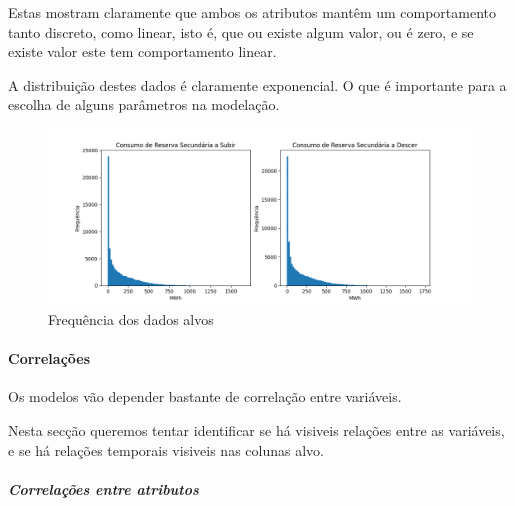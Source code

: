 Estas mostram claramente que ambos os atributos mantêm um comportamento tanto discreto, como linear, isto é, que ou existe algum valor, ou é zero, e se existe valor este tem comportamento linear.\par
A distribuição destes dados é claramente exponencial. O que é importante para a escolha de alguns parâmetros na modelação.\par

		
\begin{figure}[H]
  \centering
  \includegraphics[width=\textwidth]{plots/target_histograms.png}
  \caption{Frequência dos dados alvos}
  \label{fig:targethistograms}
\end{figure}


\paragraph{Correlações}
\text{ }  \par

Os modelos vão depender bastante de correlação entre variáveis.

Nesta secção queremos tentar identificar se há visiveis relações entre as variáveis, e se há relações temporais  visiveis nas colunas alvo.


\subparagraph{Correlações entre atributos}
\text{ }  \par


